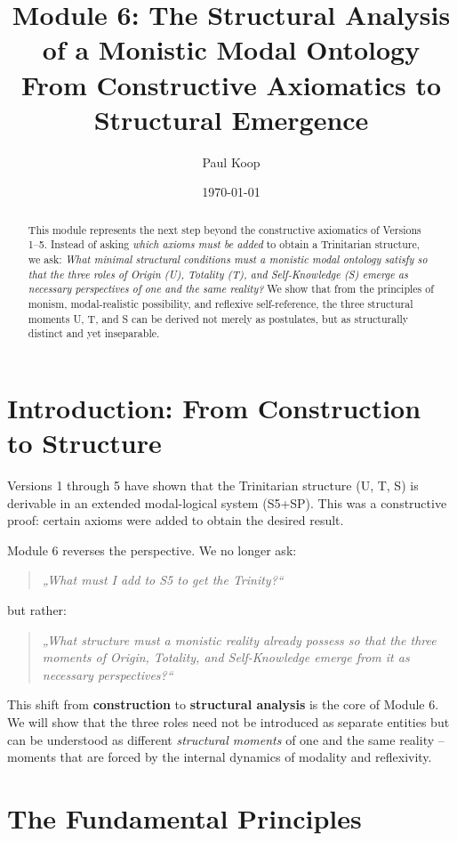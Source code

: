 \documentclass[12pt,a4paper]{article}
\title{Module 6: The Structural Analysis of a Monistic Modal Ontology \\
\large From Constructive Axiomatics to Structural Emergence}
\author{Paul Koop}
\date{\today}
\begin{document}
\maketitle

\begin{abstract}
This module represents the next step beyond the constructive axiomatics of Versions 1–5. Instead of asking \emph{which axioms must be added} to obtain a Trinitarian structure, we ask: \emph{What minimal structural conditions must a monistic modal ontology satisfy so that the three roles of Origin (U), Totality (T), and Self-Knowledge (S) emerge as necessary perspectives of one and the same reality?} We show that from the principles of monism, modal-realistic possibility, and reflexive self-reference, the three structural moments U, T, and S can be derived not merely as postulates, but as structurally distinct and yet inseparable.
\end{abstract}

\section{Introduction: From Construction to Structure}

Versions 1 through 5 have shown that the Trinitarian structure (U, T, S) is derivable in an extended modal-logical system (S5+SP). This was a constructive proof: certain axioms were added to obtain the desired result.

Module 6 reverses the perspective. We no longer ask:
\begin{quote}
\textit{„What must I add to S5 to get the Trinity?“}
\end{quote}
but rather:
\begin{quote}
\textit{„What structure must a monistic reality already possess so that the three moments of Origin, Totality, and Self-Knowledge emerge from it as necessary perspectives?“}
\end{quote}

This shift from \textbf{construction} to \textbf{structural analysis} is the core of Module 6. We will show that the three roles need not be introduced as separate entities but can be understood as different \emph{structural moments} of one and the same reality – moments that are forced by the internal dynamics of modality and reflexivity.

\section{The Fundamental Principles}
\end{document}
